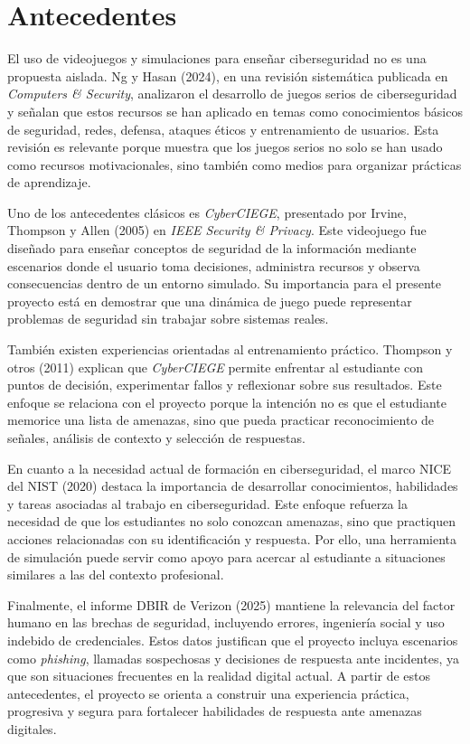 \section{Antecedentes}

El uso de videojuegos y simulaciones para enseñar ciberseguridad no es una propuesta aislada. Ng y Hasan (2024), en una revisión sistemática publicada en \textit{Computers \& Security}, analizaron el desarrollo de juegos serios de ciberseguridad y señalan que estos recursos se han aplicado en temas como conocimientos básicos de seguridad, redes, defensa, ataques éticos y entrenamiento de usuarios. Esta revisión es relevante porque muestra que los juegos serios no solo se han usado como recursos motivacionales, sino también como medios para organizar prácticas de aprendizaje.

Uno de los antecedentes clásicos es \textit{CyberCIEGE}, presentado por Irvine, Thompson y Allen (2005) en \textit{IEEE Security \& Privacy}. Este videojuego fue diseñado para enseñar conceptos de seguridad de la información mediante escenarios donde el usuario toma decisiones, administra recursos y observa consecuencias dentro de un entorno simulado. Su importancia para el presente proyecto está en demostrar que una dinámica de juego puede representar problemas de seguridad sin trabajar sobre sistemas reales.

También existen experiencias orientadas al entrenamiento práctico. Thompson y otros (2011) explican que \textit{CyberCIEGE} permite enfrentar al estudiante con puntos de decisión, experimentar fallos y reflexionar sobre sus resultados. Este enfoque se relaciona con el proyecto porque la intención no es que el estudiante memorice una lista de amenazas, sino que pueda practicar reconocimiento de señales, análisis de contexto y selección de respuestas.

En cuanto a la necesidad actual de formación en ciberseguridad, el marco NICE del NIST (2020) destaca la importancia de desarrollar conocimientos, habilidades y tareas asociadas al trabajo en ciberseguridad. Este enfoque refuerza la necesidad de que los estudiantes no solo conozcan amenazas, sino que practiquen acciones relacionadas con su identificación y respuesta. Por ello, una herramienta de simulación puede servir como apoyo para acercar al estudiante a situaciones similares a las del contexto profesional.

Finalmente, el informe DBIR de Verizon (2025) mantiene la relevancia del factor humano en las brechas de seguridad, incluyendo errores, ingeniería social y uso indebido de credenciales. Estos datos justifican que el proyecto incluya escenarios como \textit{phishing}, llamadas sospechosas y decisiones de respuesta ante incidentes, ya que son situaciones frecuentes en la realidad digital actual. A partir de estos antecedentes, el proyecto se orienta a construir una experiencia práctica, progresiva y segura para fortalecer habilidades de respuesta ante amenazas digitales.
